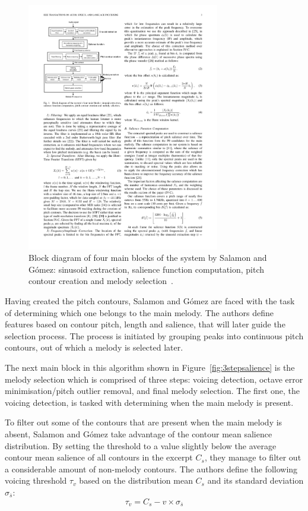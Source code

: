 \begin{figure}
  \begin{center}
    \includegraphics[width=0.75\textwidth]{Figures/salamon4blocksdiagram}
  \end{center}
  \caption{Block diagram of four main blocks of the system by Salamon and G\'{o}mez: sinusoid extraction, salience function computation, pitch contour creation and melody selection~\cite{salamon}.}
\end{figure}

Having created the pitch contours, Salamon and G\'{o}mez are faced with the task of determining which one belongs to the main melody. The authors define features based on contour pitch, length and salience, that will later guide the selection process. The process is initiated by grouping peaks into continuous pitch contours, out of which a melody is selected later. 

The next main block in this algorithm shown in Figure~\ref{fig:3stepsalience} is the melody selection which is comprised of three steps: voicing detection, octave error minimisation/pitch outlier removal, and final melody selection. The first one, the voicing detection, is tasked with determining when the main melody is present. 

To filter out some of the contours that are present when the main melody is absent, Salamon and G\'{o}mez take advantage of the contour mean salience distribution. By setting the threshold to a value slightly below the average contour mean salience of all contours in the excerpt $C_{s}$, they manage to filter out a considerable amount of non-melody contours. The authors define the following voicing threshold $\tau_{v}$ based on the distribution mean $C_{s}$ and its standard deviation $\sigma_{\overline{s}}$:
\begin{equation}
\tau_{v} = C_{s} - v \times \sigma_{\overline{s}}
\end{equation}

